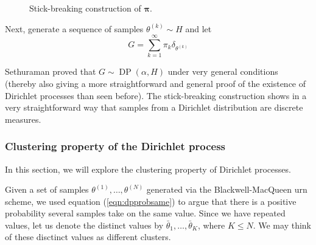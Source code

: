 \documentclass[final,3p,times,twocolumn]{elsarticle}
\DeclareMathOperator*{\DP}{DP}
\DeclareMathOperator*{\Beta}{Beta}
\let\bs\boldsymbol
\begin{document}
\begin{figure}
\caption{Stick-breaking construction of $\bs \pi$.}
\label{fig:stick}
\end{figure}

Next, generate a sequence of samples $\theta^{(k)} \sim H$ and let
\begin{equation}
G = \sum_{k=1}^\infty \pi_k \delta_{\theta^{(k)}}
\end{equation}

Sethuraman \cite{sethuraman94} proved that $G \sim \DP(\alpha,H)$ under very general conditions (thereby also giving a more straightforward and general proof of the existence of Dirichlet processes than seen before).
The stick-breaking construction shows in a very straightforward way that samples from a Dirichlet distribution are discrete measures.

\subsubsection*{\normalfont \small \bfseries Clustering property of the Dirichlet process}
\label{sect:clust}
In this section, we will explore the clustering property of Dirichlet processes.

Given a set of samples $\theta^{(1)},\dots,\theta^{(N)}$ generated via the Blackwell-MacQueen urn scheme, we used equation (\ref{eqn:dpprobsame}) to argue that there is a positive probability several samples take on the same value.
Since we have repeated values, let us denote the distinct values by $\bar \theta_1, \dots, \bar \theta_K$, where $K \leq N$.
We may think of these disctinct values as different clusters.
\end{document}

